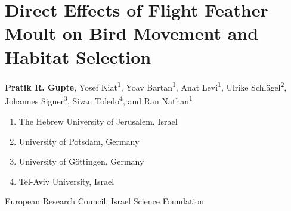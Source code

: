 \chapter{Direct Effects of Flight Feather Moult on Bird Movement and Habitat Selection}\label{ch:holeybirds}

{\noindent \textbf{Pratik R. Gupte}, Yosef Kiat\textsuperscript{1}, Yoav Bartan\textsuperscript{1}, Anat Levi\textsuperscript{1}, Ulrike Schl{\"a}gel\textsuperscript{2}, Johannes Signer\textsuperscript{3}, Sivan Toledo\textsuperscript{4}, and Ran Nathan\textsuperscript{1}}

    \medskip

    {\noindent \normalsize{}}

    \begin{enumerate}
        \item The Hebrew University of Jerusalem, Israel
        \item University of Potsdam, Germany
        \item University of G{\"o}ttingen, Germany
        \item Tel-Aviv University, Israel
    \end{enumerate}

    \medskip

    {\noindent \normalsize{}}

    \medskip
    
    \noindent European Research Council, Israel Science Foundation
